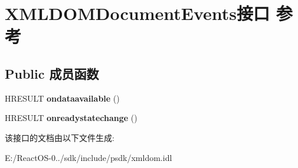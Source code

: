 \hypertarget{interface_x_m_l_d_o_m_document_events}{}\section{X\+M\+L\+D\+O\+M\+Document\+Events接口 参考}
\label{interface_x_m_l_d_o_m_document_events}
\subsection*{Public 成员函数}
\begin{DoxyCompactItemize}
\item 
\mbox{\label{interface_x_m_l_d_o_m_document_events_a5a048ad1128807bfc49dce9fdc73bdf6}} 
H\+R\+E\+S\+U\+LT {\bfseries ondataavailable} ()
\item 
\mbox{\label{interface_x_m_l_d_o_m_document_events_ab7dc4129f71f8882180be9bde5506470}} 
H\+R\+E\+S\+U\+LT {\bfseries onreadystatechange} ()
\end{DoxyCompactItemize}


该接口的文档由以下文件生成\+:\begin{DoxyCompactItemize}
\item 
E\+:/\+React\+O\+S-\/0../sdk/include/psdk/xmldom.\+idl\end{DoxyCompactItemize}
